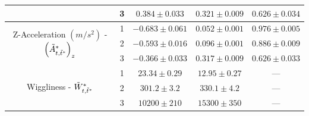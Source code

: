 \begin{table}[ht]
{\begin{tabular}{ccccc}
                                                                                   & 3                                    & $0.384  \pm 0.033$  & $0.321 \pm 0.009$ & $0.626 \pm 0.034$ \\ \hline
    \multirow{3}{*}{Z-Acceleration $(m/s^2)$ - $\left(\tilde{A}^*_{t,\tilde t^*}\right)_z$}     & 1                                    & $-0.683 \pm 0.061$  & $0.052 \pm 0.001$ & $0.976 \pm 0.005$ \\
                                                                                   & 2                                    & $-0.593 \pm 0.016$  & $0.096 \pm 0.001$ & $0.886 \pm 0.009$ \\
                                                                                   & 3                                    & $-0.366 \pm 0.033$  & $0.317 \pm 0.009$ & $0.626 \pm 0.033$ \\ \hline
    \multirow{3}{*}{Wiggliness - $\tilde{W}^*_{t,\tilde t^*}$}                                  & 1                                    & $23.34  \pm 0.29$   & $12.95 \pm 0.27$  & ---               \\
                                                                                   & 2                                    & $301.2  \pm 3.2$    & $330.1 \pm 4.2$   & ---               \\
                                                                                   & 3                                    & $10200  \pm 210$    & $15300 \pm 350$   & ---               \\ \hline
    \end{tabular}
    }
    \label{table:emis_dists_CarHHMM-DFT}
\end{table}


